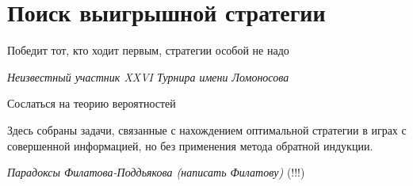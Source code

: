 

\section{Поиск выигрышной стратегии}
Победит тот, кто ходит первым, стратегии особой не надо

{\it Неизвестный участник  XXVI  Турнира имени Ломоносова}

Сослаться на теорию вероятностей

Здесь собраны задачи, связанные с нахождением оптимальной стратегии в играх с совершенной информацией, но без применения метода обратной индукции.

{\it Парадоксы Филатова-Поддьякова (написать Филатову)} (!!!)










